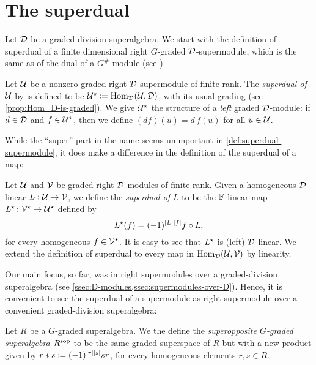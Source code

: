 \section{The superdual}\label{ssec:superdual}

Let $\mathcal{D}$ be a graded-division superalgebra. 
We start with the definition of superdual of a finite dimensional right $G$-graded $\mathcal{D}$-supermodule, which is the same as of the dual of a $G^\#$-module (see \cite[Definition 2.56]{livromicha}). 

\begin{defi}\label{def:superdual-supermodule}
    Let $\mathcal U$ be a nonzero graded right $\mathcal{D}$-supermodule of finite rank. 
    The \emph{superdual of $\mathcal U$} by is defined to be $\mathcal U^\star \coloneqq \operatorname{Hom}_{\mathcal{D}} (\mathcal U,\mathcal{D})$, with its usual grading (see \cref{prop:Hom_D-is-graded}). 
    We give $\mathcal U^\star$ the structure of a \emph{left} graded $\mathcal{D}$-module: if $d \in \mathcal{D}$ and $f \in \mathcal U ^\star$, then we define $(df)(u) = d\, f(u)$ for all $u\in \mathcal U$. 
\end{defi}

While the ``super'' part in the name seems unimportant in \cref{def:superdual-supermodule}, it does make a difference in the definition of the superdual of a map:

\begin{defi}\label{defi:superdual-map}
    Let $\mathcal U$ and $\mathcal V$ be graded right $\mathcal{D}$-modules of finite rank. 
    Given a homogeneous $\mathcal{D}$-linear
    $L:\mathcal U \rightarrow \mathcal V$, we define the \emph{superdual of $L$} to be the $\mathbb{F}$-linear map $L^\star\colon \mathcal V^\star \rightarrow \mathcal U^\star$ defined by
    \[
        L^\star (f) = (-1)^{|L||f|} f \circ L,
    \] 
    for every homogeneous $f\in \mathcal V^\star$. 
    It is easy to see that $L^\star$ is (left) $\mathcal{D}$-linear. 
    We extend the definition of superdual to every map in $\operatorname{Hom}_{\mathcal{D}} (\mathcal U, \mathcal V)$ by linearity.
\end{defi}

Our main focus, so far, was in right supermodules over a graded-division superalgebra (see \cref{ssec:D-modules,ssec:supermodules-over-D}). 
Hence, it is convenient to see the superdual of a supermodule as right supermodule over a convenient graded-division superalgebra:

\begin{defi}\label{def:superopposite}
    Let $R$ be a $G$-graded superalgebra. 
    We the define the \emph{superopposite $G$-graded superalgebra $R^{\mathrm{sop}}$} to be the same graded superspace of $R$ but with a new product given by $r * s \coloneqq (-1)^{|r||s|} sr$, for every homogeneous elements $r,s \in R$.
\end{defi}

